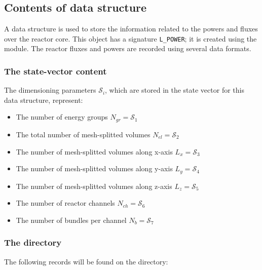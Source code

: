 \subsection{Contents of  data structure}\label{sect:power}

\vskip 0.2cm
A  data structure is used to store the information related to
the powers and fluxes over the reactor core. This object has a signature
{\tt L\_POWER}; it is created using the  module. The reactor
fluxes and powers are recorded using several data formats.

\subsubsection{The state-vector content}\label{sect:powerstate}

\noindent
The dimensioning parameters $\mathcal{S}_i$, which are stored in the state
vector for this data structure, represent:

\begin{itemize}

\item The number of energy groups $N_{gr} = \mathcal{S}_1$

\item The total number of mesh-splitted volumes $N_{el} = \mathcal{S}_2$

\item The number of mesh-splitted volumes along x-axis $L_x = \mathcal{S}_3$

\item The number of mesh-splitted volumes along y-axis $L_y = \mathcal{S}_4$

\item The number of mesh-splitted volumes along z-axis $L_z = \mathcal{S}_5$

\item The number of reactor channels $N_{ch} = \mathcal{S}_6$

\item The number of bundles per channel $N_b = \mathcal{S}_7$

\end{itemize}

\subsubsection{The  directory}\label{sect:powerdir}

\noindent
The following records will be found on the  directory:

